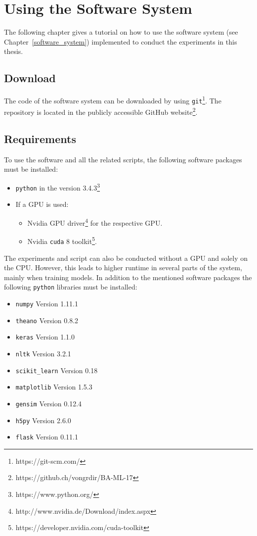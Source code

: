 \chapter{Using the Software System}
\label{appendix:software_usage}
The following chapter gives a tutorial on how to use the software system (see Chapter~\ref{software_system}) implemented to conduct the experiments in this thesis.

\section{Download}
The code of the software system can be downloaded by using \texttt{git}\footnote{https://git-scm.com/}. The repository is located in the publicly accessible GitHub website\footnote{https://github.ch/vongrdir/BA-ML-17}.

\section{Requirements}
To use the software and all the related scripts, the following software packages must be installed:

\begin{itemize}[noitemsep]
	\item \texttt{python} in the version 3.4.3\footnote{https://www.python.org/}
	\item If a GPU is used:
	\begin{itemize}[noitemsep]
		\item Nvidia GPU driver\footnote{http://www.nvidia.de/Download/index.aspx} for the respective GPU.
		\item Nvidia \texttt{cuda} 8 toolkit\footnote{https://developer.nvidia.com/cuda-toolkit}.
	\end{itemize}
\end{itemize}

The experiments and script can also be conducted without a GPU and solely on the CPU. However, this leads to higher runtime in several parts of the system, mainly when training models. In addition to the mentioned software packages the following \texttt{python} libraries must be installed:

\begin{itemize}[noitemsep]
	\item \texttt{numpy} Version 1.11.1
	\item \texttt{theano} Version 0.8.2
	\item \texttt{keras} Version 1.1.0
	\item \texttt{nltk} Version 3.2.1
	\item \texttt{scikit{\_}learn} Version 0.18
	\item \texttt{matplotlib} Version 1.5.3
	\item \texttt{gensim} Version 0.12.4
	\item \texttt{h5py} Version 2.6.0
	\item \texttt{flask} Version 0.11.1
\end{itemize}

